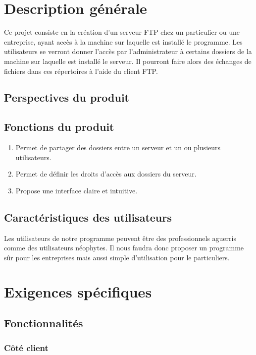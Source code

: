 \documentclass[10pt,a4paper]{report}
\begin{document}
\section{Description générale}

Ce projet consiste en la création d'un serveur FTP chez un particulier ou une entreprise, ayant accès à la machine sur laquelle est installé le programme. Les utilisateurs se verront donner l'accès par l'administrateur à certains dossiers de la machine sur laquelle est installé le serveur. Il pourront faire alors des échanges de fichiers dans ces répertoires à l'aide du client FTP.\\

\subsection{Perspectives du produit}

\subsection{Fonctions du produit}
\begin{enumerate}
\item Permet de partager des dossiers entre un serveur et un ou plusieurs utilisateurs.
\item Permet de définir les droits d'accès aux dossiers du serveur.
\item Propose une interface claire et intuitive.
\end{enumerate}

\subsection{Caractéristiques des utilisateurs}
Les utilisateurs de notre programme peuvent être des professionnels aguerris comme des utilisateurs néophytes. Il nous faudra donc proposer un programme sûr pour les entreprises mais aussi simple d'utilisation pour le particuliers.

\section{Exigences spécifiques}

\subsection{Fonctionnalités}

\subsubsection{Côté client}
\end{document}
